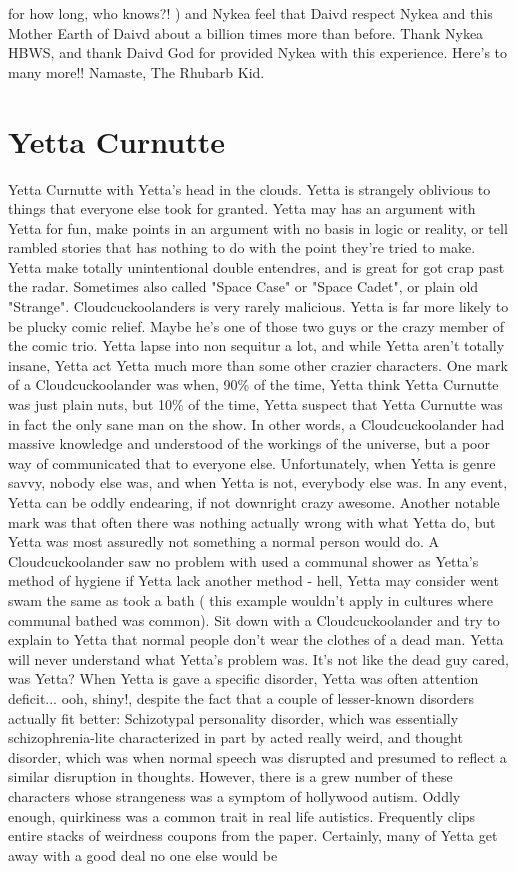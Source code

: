 \documentclass[12pt]{book}
\begin{document}
for how long, who knows?! ) and Nykea feel that Daivd respect Nykea and this Mother Earth of Daivd about a billion times more than before. Thank Nykea HBWS, and thank Daivd God for provided Nykea with this experience. Here's to many more!! Namaste, The Rhubarb Kid.



\chapter{Yetta Curnutte}

Yetta Curnutte with Yetta's head in the clouds. Yetta is strangely oblivious to things that everyone else took for granted. Yetta may has an argument with Yetta for fun, make points in an argument with no basis in logic or reality, or tell rambled stories that has nothing to do with the point they're tried to make. Yetta make totally unintentional double entendres, and is great for got crap past the radar. Sometimes also called "Space Case" or "Space Cadet", or plain old "Strange". Cloudcuckoolanders is very rarely malicious. Yetta is far more likely to be plucky comic relief. Maybe he's one of those two guys or the crazy member of the comic trio. Yetta lapse into non sequitur a lot, and while Yetta aren't totally insane, Yetta act Yetta much more than some other crazier characters. One mark of a Cloudcuckoolander was when, 90\% of the time, Yetta think Yetta Curnutte was just plain nuts, but 10\% of the time, Yetta suspect that Yetta Curnutte was in fact the only sane man on the show. In other words, a Cloudcuckoolander had massive knowledge and understood of the workings of the universe, but a poor way of communicated that to everyone else. Unfortunately, when Yetta is genre savvy, nobody else was, and when Yetta is not, everybody else was. In any event, Yetta can be oddly endearing, if not downright crazy awesome. Another notable mark was that often there was nothing actually wrong with what Yetta do, but Yetta was most assuredly not something a normal person would do. A Cloudcuckoolander saw no problem with used a communal shower as Yetta's method of hygiene if Yetta lack another method - hell, Yetta may consider went swam the same as took a bath ( this example wouldn't apply in cultures where communal bathed was common). Sit down with a Cloudcuckoolander and try to explain to Yetta that normal people don't wear the clothes of a dead man. Yetta will never understand what Yetta's problem was. It's not like the dead guy cared, was Yetta? When Yetta is gave a specific disorder, Yetta was often attention deficit... ooh, shiny!, despite the fact that a couple of lesser-known disorders actually fit better: Schizotypal personality disorder, which was essentially schizophrenia-lite characterized in part by acted really weird, and thought disorder, which was when normal speech was disrupted and presumed to reflect a similar disruption in thoughts. However, there is a grew number of these characters whose strangeness was a symptom of hollywood autism. Oddly enough, quirkiness was a common trait in real life autistics. Frequently clips entire stacks of weirdness coupons from the paper. Certainly, many of Yetta get away with a good deal no one else would be 
\end{document}
